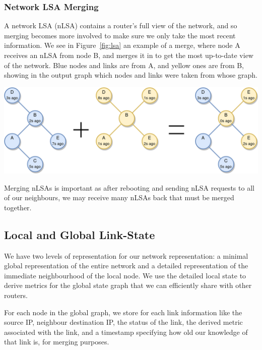 \documentclass[withindex,glossary,openany]{cam-thesis}
\begin{document}
\subsubsection{Network LSA Merging}

A network LSA (nLSA) contains a router's full view of the network, and so merging becomes more involved to make sure we only take the most recent information. We see in Figure~\ref{fig:lsa} an example of a merge, where node A receives an nLSA from node B, and merges it in to get the most up-to-date view of the network. Blue nodes and links are from A, and yellow ones are from B, showing in the output graph which nodes and links were taken from whose graph.

\begin{center}
\begin{minipage}{0.9\textwidth} \centering
	\includegraphics[width=1\textwidth]{lsa}
	\label{fig:lsa}
\end{minipage}
\end{center}

Merging nLSAs is important as after rebooting and sending nLSA requests to all of our neighbours, we may receive many nLSAs back that must be merged together.

\subsection{Local and Global Link-State}

We have two levels of representation for our network representation: a minimal global representation of the entire network and a detailed representation of the immediate neighbourhood of the local node. We use the detailed local state to derive metrics for the global state graph that we can efficiently share with other routers.

For each node in the global graph, we store for each link information like the source IP, neighbour destination IP, the status of the link, the derived metric associated with the link, and a timestamp specifying how old our knowledge of that link is, for merging purposes.
\end{document}
